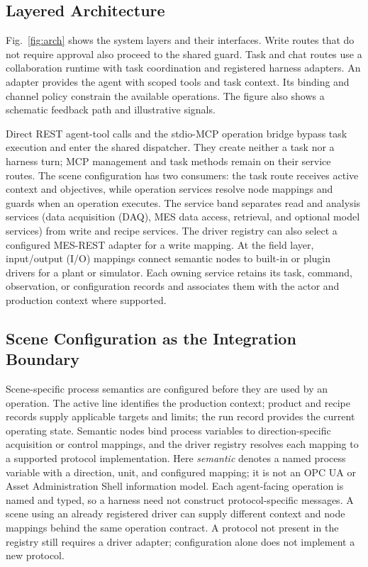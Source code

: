 \documentclass[journal]{IEEEtran}
\begin{document}
\subsection{Layered Architecture}
\label{sec:layers}
Fig.~\ref{fig:arch} shows the system layers and their interfaces. Write routes
that do not require approval also proceed to the shared guard. Task and chat
routes use a collaboration runtime with task coordination and registered
harness adapters. An adapter provides the agent with scoped tools and task context.
Its binding and channel policy constrain the available operations. The figure
also shows a schematic feedback path and illustrative signals.

Direct REST agent-tool calls and the stdio-MCP operation bridge bypass task execution
and enter the shared dispatcher. They create neither a task nor a harness
turn; MCP management and task methods remain on their service routes. The
scene configuration has two consumers: the task route receives active context
and objectives, while operation services resolve node mappings and guards
when an operation executes. The service band separates read and analysis services (data acquisition (DAQ), MES data access,
retrieval, and optional model services) from write and recipe services. The driver registry can also select a configured MES-REST adapter
for a write mapping. At the field layer, input/output (I/O) mappings connect
semantic nodes to built-in or plugin drivers for a plant or simulator. Each
owning service retains its task, command, observation, or configuration
records and associates them with the actor and production context where
supported.

\subsection{Scene Configuration as the Integration Boundary}
\label{sec:scene-config}
Scene-specific process semantics are configured before
they are used by an operation. The active line identifies the production context; product
and recipe records supply applicable targets and limits; the run record
provides the current operating state. Semantic nodes bind process variables
to direction-specific acquisition or control mappings, and the driver
registry resolves each mapping to a supported protocol implementation. Here
\emph{semantic} denotes a named process variable with a direction, unit, and
configured mapping; it is not an OPC UA or Asset Administration Shell
information model. Each agent-facing operation is named and typed, so a harness need not
construct protocol-specific messages. A scene using an already registered
driver can supply different context and node mappings behind the same
operation contract. A protocol not present in the registry still requires a
driver adapter; configuration alone does not implement a new protocol.
\end{document}
